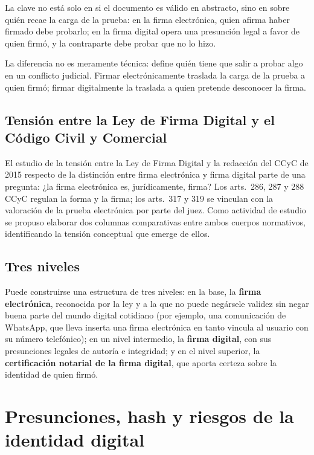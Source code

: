 \documentclass[12pt,oneside]{book}
\begin{document}
La clave no está solo en si el documento es válido en abstracto, sino en sobre quién recae la carga de la prueba: en la firma electrónica, quien afirma haber firmado debe probarlo; en la firma digital opera una presunción legal a favor de quien firmó, y la contraparte debe probar que no lo hizo.

\begin{important}
La diferencia no es meramente técnica: define quién tiene que salir a probar algo en un conflicto judicial. Firmar electrónicamente traslada la carga de la prueba a quien firmó; firmar digitalmente la traslada a quien pretende desconocer la firma.
\end{important}

\subsection{Tensión entre la Ley de Firma Digital y el Código Civil y Comercial}

El estudio de la tensión entre la Ley de Firma Digital y la redacción del CCyC de 2015 respecto de la distinción entre firma electrónica y firma digital parte de una pregunta: ¿la firma electrónica es, jurídicamente, firma? Los arts.~286, 287 y 288 CCyC regulan la forma y la firma; los arts.~317 y 319 se vinculan con la valoración de la prueba electrónica por parte del juez. Como actividad de estudio se propuso elaborar dos columnas comparativas entre ambos cuerpos normativos, identificando la tensión conceptual que emerge de ellos.

\subsection{Tres niveles}

Puede construirse una estructura de tres niveles: en la base, la \textbf{firma electrónica}, reconocida por la ley y a la que no puede negársele validez sin negar buena parte del mundo digital cotidiano (por ejemplo, una comunicación de WhatsApp, que lleva inserta una firma electrónica en tanto vincula al usuario con su número telefónico); en un nivel intermedio, la \textbf{firma digital}, con sus presunciones legales de autoría e integridad; y en el nivel superior, la \textbf{certificación notarial de la firma digital}, que aporta certeza sobre la identidad de quien firmó.

\section{Presunciones, hash y riesgos de la identidad digital}
\end{document}
